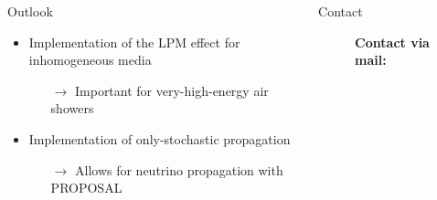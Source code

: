 \documentclass[t]{beamer}
\newlength{\itemseparation}
\begin{document}
  \begin{columns}[onlytextwidth]%
    \begin{column}{0.4\textwidth}%
      \begin{block}[equal height group=Z]{Outlook}%
        \begin{itemize}
          \setlength\itemsep{\itemseparation}
          \item Implementation of the LPM effect for inhomogeneous media
          \begin{itemize}
            \setlength\itemsep{\itemseparation}
            \item[$\rightarrow$] Important for very-high-energy air showers
          \end{itemize}
          \item Implementation of only-stochastic propagation
          \begin{itemize}
            \setlength\itemsep{\itemseparation}
            \item[$\rightarrow$] Allows for neutrino propagation with PROPOSAL
          \end{itemize}
        \end{itemize}
      \end{block}
    \end{column}
    \begin{column}{0.4\textwidth}%
      \begin{block}[equal height group=Z]{Contact}%
        \begin{center}
          \begin{figure}[ht]
            \begin{minipage}[ht]{0.5\linewidth}
              \textbf{Contact via mail:}


\end{minipage}
\end{figure}
\end{center}
\end{block}
\end{column}
\end{columns}
\end{document}
